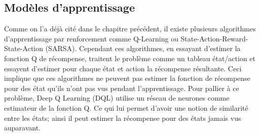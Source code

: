 \subsection{Modèles d'apprentissage}
Comme on l'a déjà cité dans le chapitre précédent, il existe plusieurs algorithmes d'apprentissage par renforcement comme Q-Learning ou State-Action-Reward-State-Action (SARSA)\cite{Rummery1994}. Cependant ces algorithmes, en essayant d'estimer la fonction Q de récompense, traitent le problème comme un tableau état/action et essayent d'estimer pour chaque état et action la récompense résultante. Ceci implique que ces algorithmes ne peuvent pas estimer la fonction de récompense pour des état qu'ils n'ont pas vus pendant l'apprentissage. Pour pallier à ce problème, Deep Q Learning (DQL)\cite{Mnih2015} utilise un réseau de neurones comme estimateur de la fonction Q. Ce qui lui permet d'avoir une notion de similarité entre les états; ainsi il peut estimer la récompense pour des états jamais vus auparavant.
